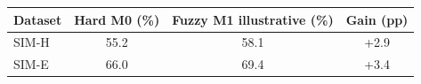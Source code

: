 \begin{tabular}{@{}lccc@{}}
\toprule
Dataset & Hard M0 (\%) & Fuzzy M1 illustrative (\%) & Gain (pp) \\
\midrule
SIM-H & 55.2 & 58.1 & +2.9 \\
SIM-E & 66.0 & 69.4 & +3.4 \\
\bottomrule
\end{tabular}
